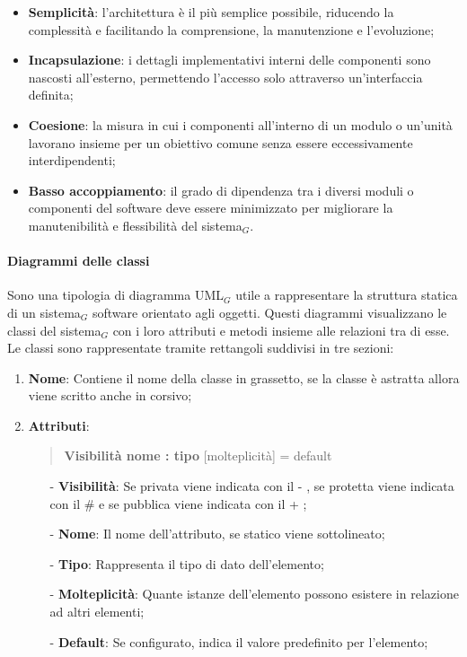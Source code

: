\documentclass[10pt]{article}
\begin{document}
\begin{justify}
\begin{itemize}
            \item \textbf{Semplicità}: l'architettura è il più semplice possibile, riducendo la complessità e facilitando la comprensione, la manutenzione e l'evoluzione;
            \item \textbf{Incapsulazione}: i dettagli implementativi interni delle componenti sono nascosti all'esterno, permettendo l'accesso solo attraverso un'interfaccia definita;
            \item \textbf{Coesione}: la misura in cui i componenti all'interno di un modulo o un'unità lavorano insieme per un obiettivo comune senza essere eccessivamente interdipendenti;
            \item \textbf{Basso accoppiamento}: il grado di dipendenza tra i diversi moduli o componenti del software deve essere minimizzato per migliorare la manutenibilità e flessibilità del sistema$_G$.
        \end{itemize}

        \paragraph{Diagrammi delle classi}
        Sono una tipologia di diagramma UML$_G$ utile a rappresentare la struttura statica di un sistema$_G$ software orientato agli oggetti. Questi diagrammi visualizzano le classi del sistema$_G$ con i loro attributi e metodi insieme alle relazioni tra di esse.\\
        Le classi sono rappresentate tramite rettangoli suddivisi in tre sezioni:
        \begin{enumerate}
            \item \textbf{Nome}: Contiene il nome della classe in grassetto, se la classe è astratta allora viene scritto anche in corsivo;
            \item \textbf{Attributi}:
            \begin{quote}
                \textbf{Visibilità nome : tipo} [molteplicità] = default
            \end{quote}
            \begin{itemize}
                \item [-] \textbf{Visibilità}: Se privata viene indicata con il - , se protetta viene indicata con il \# e se pubblica viene indicata con il + ;
                \item [-] \textbf{Nome}: Il nome dell'attributo, se statico viene sottolineato;
                \item [-] \textbf{Tipo}: Rappresenta il tipo di dato dell'elemento;
                \item [-] \textbf{Molteplicità}: Quante istanze dell'elemento possono esistere in relazione ad altri elementi;
                \item [-] \textbf{Default}: Se configurato, indica il valore predefinito per l'elemento;
            \end{itemize}


\end{enumerate}
\end{justify}
\end{document}
